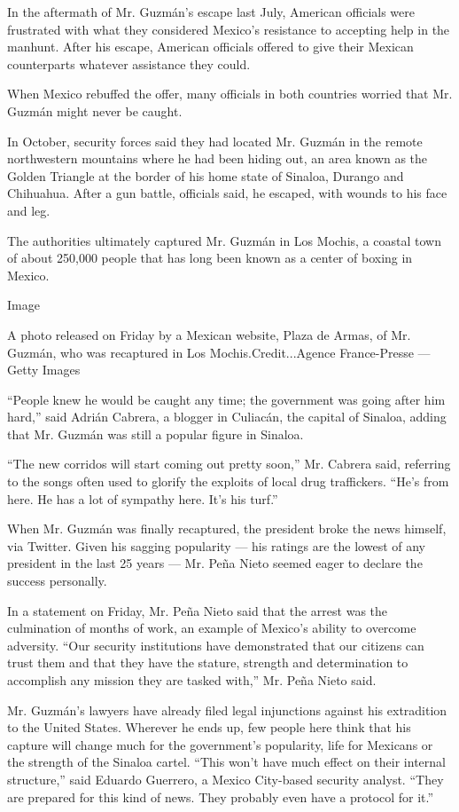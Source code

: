 In the aftermath of Mr. Guzmán's escape last July, American officials
were frustrated with what they considered Mexico's resistance to
accepting help in the manhunt. After his escape, American officials
offered to give their Mexican counterparts whatever assistance they
could.

When Mexico rebuffed the offer, many officials in both countries worried
that Mr. Guzmán might never be caught.

In October, security forces said they had located Mr. Guzmán in the
remote northwestern mountains where he had been hiding out, an area
known as the Golden Triangle at the border of his home state of Sinaloa,
Durango and Chihuahua. After a gun battle, officials said, he escaped,
with wounds to his face and leg.

The authorities ultimately captured Mr. Guzmán in Los Mochis, a coastal
town of about 250,000 people that has long been known as a center of
boxing in Mexico.

Image

A photo released on Friday by a Mexican website, Plaza de Armas, of Mr.
Guzmán, who was recaptured in Los Mochis.Credit...Agence France-Presse
--- Getty Images

``People knew he would be caught any time; the government was going
after him hard,'' said Adrián Cabrera, a blogger in Culiacán, the
capital of Sinaloa, adding that Mr. Guzmán was still a popular figure in
Sinaloa.

``The new corridos will start coming out pretty soon,'' Mr. Cabrera
said, referring to the songs often used to glorify the exploits of local
drug traffickers. ``He's from here. He has a lot of sympathy here. It's
his turf.''

When Mr. Guzmán was finally recaptured, the president broke the news
himself, via Twitter. Given his sagging popularity --- his ratings are
the lowest of any president in the last 25 years --- Mr. Peña Nieto
seemed eager to declare the success personally.

In a statement on Friday, Mr. Peña Nieto said that the arrest was the
culmination of months of work, an example of Mexico's ability to
overcome adversity. ``Our security institutions have demonstrated that
our citizens can trust them and that they have the stature, strength and
determination to accomplish any mission they are tasked with,'' Mr. Peña
Nieto said.

Mr. Guzmán's lawyers have already filed legal injunctions against his
extradition to the United States. Wherever he ends up, few people here
think that his capture will change much for the government's popularity,
life for Mexicans or the strength of the Sinaloa cartel. ``This won't
have much effect on their internal structure,'' said Eduardo Guerrero, a
Mexico City-based security analyst. ``They are prepared for this kind of
news. They probably even have a protocol for it.''

